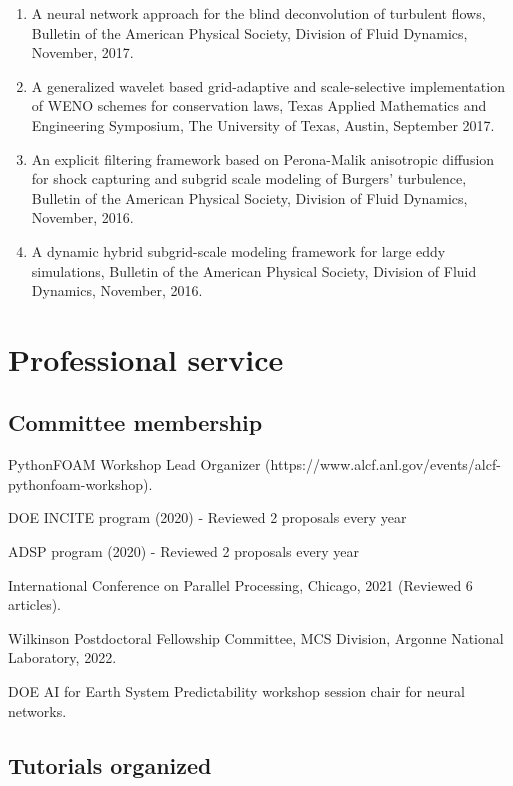 \documentclass[letterpaper]{article}
\renewenvironment{itemize}{
  \begin{list}{}{
    \setlength{\leftmargin}{1.5em}
  }
}{
  \end{list}
}
\begin{document}
\begin{enumerate}
\item A neural network approach for the blind deconvolution of turbulent flows, Bulletin of the American Physical Society, Division of Fluid Dynamics, November, 2017.

\item A generalized wavelet based grid-adaptive and scale-selective implementation of WENO schemes for conservation laws, Texas Applied Mathematics and Engineering Symposium, The University of Texas, Austin, September 2017.

\item An explicit filtering framework based on Perona-Malik anisotropic diffusion for shock capturing and subgrid scale modeling of Burgers' turbulence, Bulletin of the American Physical Society, Division of Fluid Dynamics, November, 2016.

\item A dynamic hybrid subgrid-scale modeling framework for large eddy simulations, Bulletin of the American Physical Society, Division of Fluid Dynamics, November, 2016.

\end{enumerate}

\section*{Professional service}

\subsection*{Committee membership}

\begin{itemize}
\item PythonFOAM Workshop Lead Organizer (https://www.alcf.anl.gov/events/alcf-pythonfoam-workshop).
\item DOE INCITE program (2020) - Reviewed 2 proposals every year
\item ADSP program (2020) - Reviewed 2 proposals every year
\item International Conference on Parallel Processing, Chicago, 2021 (Reviewed 6 articles).
\item Wilkinson Postdoctoral Fellowship Committee, MCS Division, Argonne National Laboratory, 2022.
\item DOE AI for Earth System Predictability workshop session chair for neural networks.
\end{itemize}

\subsection*{Tutorials organized}
\end{document}
